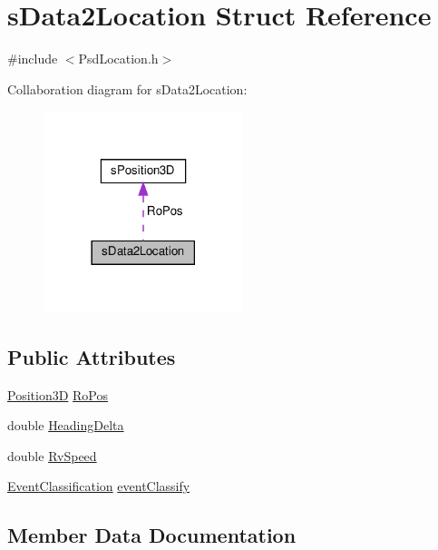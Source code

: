 \hypertarget{structs_data2_location}{}\section{s\+Data2\+Location Struct Reference}
\label{structs_data2_location}


{\ttfamily \#include $<$Psd\+Location.\+h$>$}



Collaboration diagram for s\+Data2\+Location\+:
\nopagebreak
\begin{figure}[H]
\begin{center}
\leavevmode
\includegraphics[width=165pt]{structs_data2_location__coll__graph}
\end{center}
\end{figure}
\subsection*{Public Attributes}
\begin{DoxyCompactItemize}
\item 
\hyperlink{_geometric_calc_8h_aabfa1dd0400b274a48b4a45afbee0af4}{Position3D} \hyperlink{structs_data2_location_abcac106c1692d71348a9184a194a9e02}{Ro\+Pos}
\item 
double \hyperlink{structs_data2_location_ae46f8fccbf91e76dc5c389bbf08ab927}{Heading\+Delta}
\item 
double \hyperlink{structs_data2_location_a989f56d96048891777a1ffdfec13fdab}{Rv\+Speed}
\item 
\hyperlink{_psd_location_8h_a6f150184d2a8f67d5c7de45bac365d15}{Event\+Classification} \hyperlink{structs_data2_location_ae207b6bc1ed4bb06e2b2f380f1ea6152}{event\+Classify}
\end{DoxyCompactItemize}


\subsection{Member Data Documentation}
\mbox{\label{structs_data2_location_ae207b6bc1ed4bb06e2b2f380f1ea6152}} 
